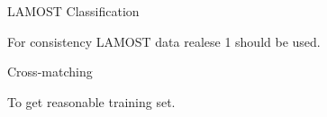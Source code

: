 \chap LAMOST Classification

For consistency LAMOST data realese 1 should be used.

\sec Cross-matching

To get reasonable training set.
